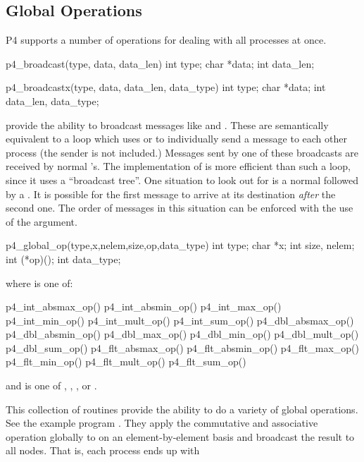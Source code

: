 \subsection{Global Operations}

P4 supports a number of operations for dealing with all processes at once.

\begin{example}
p4_broadcast(type, data, data_len)
int type;
char *data;
int data_len;
\end{example}

\begin{example}
p4_broadcastx(type, data, data_len, data_type)
int type;
char *data;
int data_len, data_type;
\end{example}
\noindent
provide the ability to broadcast messages like  and
.  These are semantically equivalent to a loop which uses
 or  to individually send a message to each other
process (the sender is not included.)  Messages sent by one of these
broadcasts are received by normal 's.  The implementation of
 is more efficient than such a loop, since it uses a
``broadcast tree''.  One situation to look out for is a normal
 followed by a .  It is possible for the first
message to arrive at its destination {\em after\/} the second one.  The order
of messages in this situation can be enforced with the use of the 
argument. 

\begin{example}
p4_global_op(type,x,nelem,size,op,data_type) 
int type;
char *x;
int size, nelem;
int (*op)();
int data_type;
\end{example}
\noindent
where  is one of:
\begin{example}
p4_int_absmax_op()
p4_int_absmin_op()
p4_int_max_op()
p4_int_min_op()
p4_int_mult_op()
p4_int_sum_op()
p4_dbl_absmax_op()
p4_dbl_absmin_op()
p4_dbl_max_op()
p4_dbl_min_op()
p4_dbl_mult_op()
p4_dbl_sum_op()
p4_flt_absmax_op()
p4_flt_absmin_op()
p4_flt_max_op()
p4_flt_min_op()
p4_flt_mult_op()
p4_flt_sum_op()
\end{example}

\noindent
and  is one of , , , or
.

This collection of routines provide the ability to do a variety of global
operations.  See the example program .  They apply
the commutative and associative operation  globally to  on an
element-by-element basis and broadcast the result to all nodes.  That is, each
process ends up with

